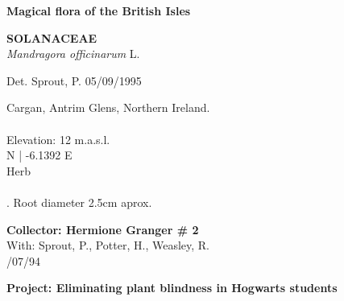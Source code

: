 \documentclass[
]{article}
\author{}
\date{\vspace{-2.5em}}
\begin{document}
\begin{mdframed}[linewidth=2pt,linecolor=black, innerleftmargin = 1.5 cm, innerrightmargin = 1.5 cm]

\begin{center}
\bigskip
{\fontsize{30pt}{100pt}\selectfont\bf Magical flora of the British Isles } \\
\end{center}
\begin{flushright}
\begin{minipage}[c][20ex][c]{15em}  
\end{minipage}
\end{flushright}
\begin{flushleft}
{\fontsize{35pt}{100pt}\selectfont\bf SOLANACEAE  } \\
\vfill
{\fontsize{35pt}{100pt}\selectfont\emph{ Mandragora officinarum }  L. } \\
\end{flushleft}
\begin{flushright}
{\fontsize{22.55pt}{100pt}\selectfont Det. Sprout, P.   05/09/1995 } \\
\end{flushright}
\vfill
\bigskip
\bigskip
\begin{flushleft}
{\fontsize{25pt}{100pt}\selectfont Cargan, Antrim Glens, Northern Ireland. } \\
{\fontsize{25pt}{100pt}\selectfont ~ } \\
{\fontsize{25pt}{100pt}\selectfont Elevation: 12 m.a.s.l. }\\
{\fontsize{25pt}{100pt} N  |  -6.1392 E } \\
\vfill
{\fontsize{25pt}{100pt}\selectfont Herb } \\
{\fontsize{25pt}{100pt}\selectfont ~ } \\
{\fontsize{25pt}{100pt}\selectfont 45cm. Root diameter 2.5cm aprox. } \\
\end{flushleft}
\vfill
\begin{flushright}
{\fontsize{20pt}{100pt}\selectfont\bf Collector:  Hermione Granger  \# 2 } \\
{\fontsize{20pt}{100pt}\selectfont With:  Sprout, P., Potter, H., Weasley, R. } \\
{\fontsize{20pt}{100pt}/07/94 } \\
\end{flushright}
\vfill
\begin{center}
{\fontsize{25pt}{80pt}\selectfont\bf  Project: Eliminating plant blindness in Hogwarts students } \\
\end{center}
\end{mdframed}
\end{document}
